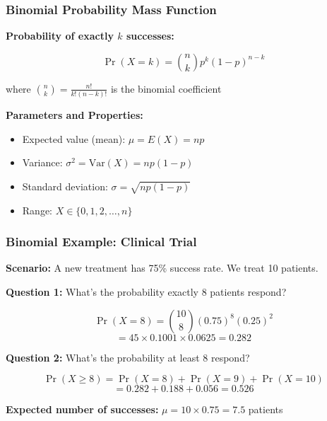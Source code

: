 \documentclass{beamer}
\begin{document}
\begin{frame}
\frametitle{Binomial Probability Mass Function}
\textbf{Probability of exactly $k$ successes:}

$$\Pr(X = k) = \binom{n}{k} p^k (1-p)^{n-k}$$

where $\binom{n}{k} = \frac{n!}{k!(n-k)!}$ is the binomial coefficient

\vspace{0.5cm}
\textbf{Parameters and Properties:}
\begin{itemize}
\item Expected value (mean): $\mu = E(X) = np$
\item Variance: $\sigma^2 = \text{Var}(X) = np(1-p)$
\item Standard deviation: $\sigma = \sqrt{np(1-p)}$
\item Range: $X \in \{0, 1, 2, \ldots, n\}$
\end{itemize}
\end{frame}

\begin{frame}
\frametitle{Binomial Example: Clinical Trial}
\textbf{Scenario:} A new treatment has 75\% success rate. We treat 10 patients.

\vspace{0.3cm}
\textbf{Question 1:} What's the probability exactly 8 patients respond?

\vspace{0.2cm}
$$\Pr(X = 8) = \binom{10}{8} (0.75)^8 (0.25)^2$$
$$= 45 \times 0.1001 \times 0.0625 = 0.282$$

\vspace{0.3cm}
\textbf{Question 2:} What's the probability at least 8 respond?

\vspace{0.2cm}
$$\Pr(X \geq 8) = \Pr(X=8) + \Pr(X=9) + \Pr(X=10)$$
$$= 0.282 + 0.188 + 0.056 = 0.526$$

\vspace{0.3cm}
\textbf{Expected number of successes:} $\mu = 10 \times 0.75 = 7.5$ patients
\end{frame}
\end{document}
